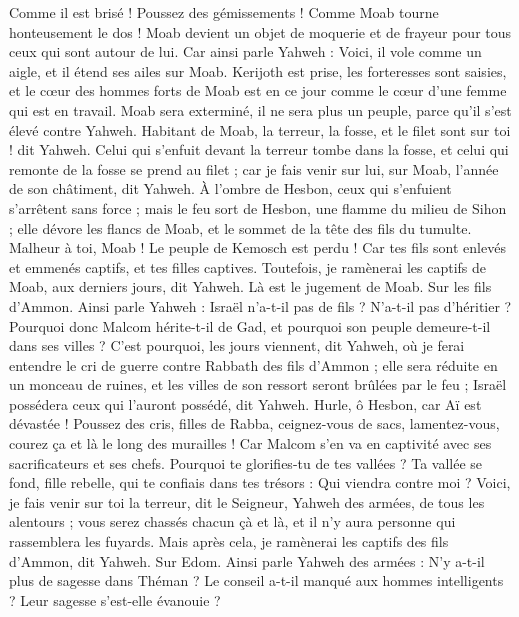 \begin{multicols}{2}
Comme il est brisé ! Poussez des gémissements ! Comme Moab tourne honteusement le dos ! Moab devient un objet de moquerie et de frayeur pour tous ceux qui sont autour de lui.
Car ainsi parle Yahweh : Voici, il vole comme un aigle, et il étend ses ailes sur Moab.
Kerijoth est prise, les forteresses sont saisies, et le cœur des hommes forts de Moab est en ce jour comme le cœur d'une femme qui est en travail.
Moab sera exterminé, il ne sera plus un peuple, parce qu'il s'est élevé contre Yahweh.
Habitant de Moab, la terreur, la fosse, et le filet sont sur toi ! dit Yahweh.
Celui qui s'enfuit devant la terreur tombe dans la fosse, et celui qui remonte de la fosse se prend au filet ; car je fais venir sur lui, sur Moab, l'année de son châtiment, dit Yahweh.
À l'ombre de Hesbon, ceux qui s'enfuient s'arrêtent sans force ; mais le feu sort de Hesbon, une flamme du milieu de Sihon ; elle dévore les flancs de Moab, et le sommet de la tête des fils du tumulte.
Malheur à toi, Moab ! Le peuple de Kemosch est perdu ! Car tes fils sont enlevés et emmenés captifs, et tes filles captives.
Toutefois, je ramènerai les captifs de Moab, aux derniers jours, dit Yahweh. Là est le jugement de Moab.
\VerseOne{}Sur les fils d'Ammon. Ainsi parle Yahweh : Israël n'a-t-il pas de fils ? N'a-t-il pas d'héritier ? Pourquoi donc Malcom hérite-t-il de Gad, et pourquoi son peuple demeure-t-il dans ses villes ?
C'est pourquoi, les jours viennent, dit Yahweh, où je ferai entendre le cri de guerre contre Rabbath des fils d'Ammon ; elle sera réduite en un monceau de ruines, et les villes de son ressort seront brûlées par le feu ; Israël possédera ceux qui l'auront possédé, dit Yahweh.
Hurle, ô Hesbon, car Aï est dévastée ! Poussez des cris, filles de Rabba, ceignez-vous de sacs, lamentez-vous, courez ça et là le long des murailles ! Car Malcom s'en va en captivité avec ses sacrificateurs et ses chefs.
Pourquoi te glorifies-tu de tes vallées ? Ta vallée se fond, fille rebelle, qui te confiais dans tes trésors : Qui viendra contre moi ?
Voici, je fais venir sur toi la terreur, dit le Seigneur, Yahweh des armées, de tous les alentours ; vous serez chassés chacun çà et là, et il n'y aura personne qui rassemblera les fuyards.
Mais après cela, je ramènerai les captifs des fils d'Ammon, dit Yahweh.
Sur Edom. Ainsi parle Yahweh des armées : N'y a-t-il plus de sagesse dans Théman ? Le conseil a-t-il manqué aux hommes intelligents ? Leur sagesse s'est-elle évanouie ?

\end{multicols}
